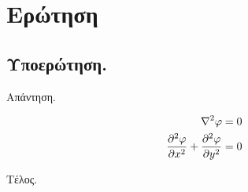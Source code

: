 \documentclass[report_main_template.tex]{subfiles}
\begin{document}
\section{Ερώτηση}

\subsection{Υποερώτηση.}

Απάντηση.

\begin{align*}
    \displaystyle %
    \nabla^2\varphi                         &= 0 \\
    \pd[2]{\varphi}{x} + \pd[2]{\varphi}{y} &= 0
\end{align*}

Τέλος.






\end{document}
